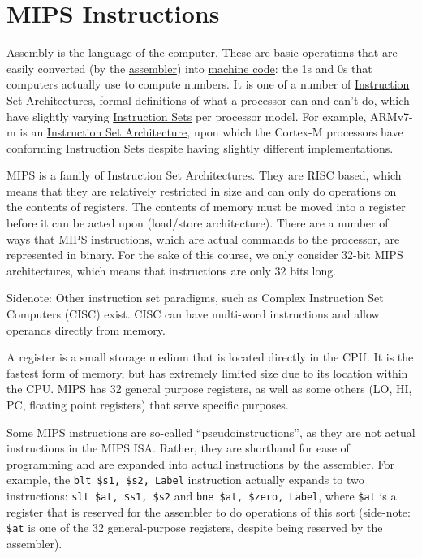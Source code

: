 \documentclass{article}
\begin{document}
\section{MIPS Instructions}

Assembly is the language of the computer. These are basic operations that are easily converted (by the \underline{assembler}) into \underline{machine code}: the 1s and 0s that computers actually use to compute numbers. It is one of a number of \underline{Instruction Set Architectures}, formal definitions of what a processor can and can't do, which have slightly varying \underline{Instruction Sets} per processor model. For example, ARMv7-m is an \underline{Instruction Set Architecture}, upon which the Cortex-M processors have conforming \underline{Instruction Sets} despite having slightly different implementations. 

MIPS is a family of Instruction Set Architectures. They are RISC based, which means that they are relatively restricted in size and can only do operations on the contents of registers. The contents of memory must be moved into a register before it can be acted upon (load/store architecture). There are a number of ways that MIPS instructions, which are actual commands to the processor, are represented in binary. For the sake of this course, we only consider 32-bit MIPS architectures, which means that instructions are only 32 bits long. 

Sidenote: Other instruction set paradigms, such as Complex Instruction Set Computers (CISC) exist. CISC can have multi-word instructions and allow operands directly from memory. 

A register is a small storage medium that is located directly in the CPU. It is the fastest form of memory, but has extremely limited size due to its location within the CPU. MIPS has 32 general purpose registers, as well as some others (LO, HI, PC, floating point registers) that serve specific purposes. 

Some MIPS instructions are so-called ``pseudoinstructions'', as they are not actual instructions in the MIPS ISA. Rather, they are shorthand for ease of programming and are expanded into actual instructions by the assembler. For example, the \texttt{blt \$s1, \$s2, Label} instruction actually expands to two instructions: \texttt{slt \$at, \$s1, \$s2} and \texttt{bne \$at, \$zero, Label}, where \texttt{\$at} is a register that is reserved for the assembler to do operations of this sort (side-note: \texttt{\$at} is one of the 32 general-purpose registers, despite being reserved by the assembler). 
\end{document}

